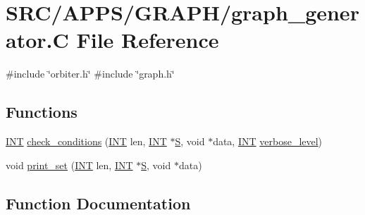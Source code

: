 \hypertarget{graph__generator_8_c}{}\section{S\+R\+C/\+A\+P\+P\+S/\+G\+R\+A\+P\+H/graph\+\_\+generator.C File Reference}
\label{graph__generator_8_c}
{\ttfamily \#include \char`\"{}orbiter.\+h\char`\"{}}\newline
{\ttfamily \#include \char`\"{}graph.\+h\char`\"{}}\newline
\subsection*{Functions}
\begin{DoxyCompactItemize}
\item 
\mbox{\hyperlink{galois_8h_a09fddde158a3a20bd2dcadb609de11dc}{I\+NT}} \mbox{\hyperlink{graph__generator_8_c_a923b0fc3a8de3ffb65081770b372075a}{check\+\_\+conditions}} (\mbox{\hyperlink{galois_8h_a09fddde158a3a20bd2dcadb609de11dc}{I\+NT}} len, \mbox{\hyperlink{galois_8h_a09fddde158a3a20bd2dcadb609de11dc}{I\+NT}} $\ast$\mbox{\hyperlink{simeon_8_c_adab47f8243f1b5a2c31df2535d6b37d0}{S}}, void $\ast$data, \mbox{\hyperlink{galois_8h_a09fddde158a3a20bd2dcadb609de11dc}{I\+NT}} \mbox{\hyperlink{simeon_8_c_a818073fbcc2f439e7c56952f67386122}{verbose\+\_\+level}})
\item 
void \mbox{\hyperlink{graph__generator_8_c_a8c1a5fc71aea7ff31d181f0103196a24}{print\+\_\+set}} (\mbox{\hyperlink{galois_8h_a09fddde158a3a20bd2dcadb609de11dc}{I\+NT}} len, \mbox{\hyperlink{galois_8h_a09fddde158a3a20bd2dcadb609de11dc}{I\+NT}} $\ast$\mbox{\hyperlink{simeon_8_c_adab47f8243f1b5a2c31df2535d6b37d0}{S}}, void $\ast$data)
\end{DoxyCompactItemize}


\subsection{Function Documentation}
\mbox{\label{graph__generator_8_c_a923b0fc3a8de3ffb65081770b372075a}} 
